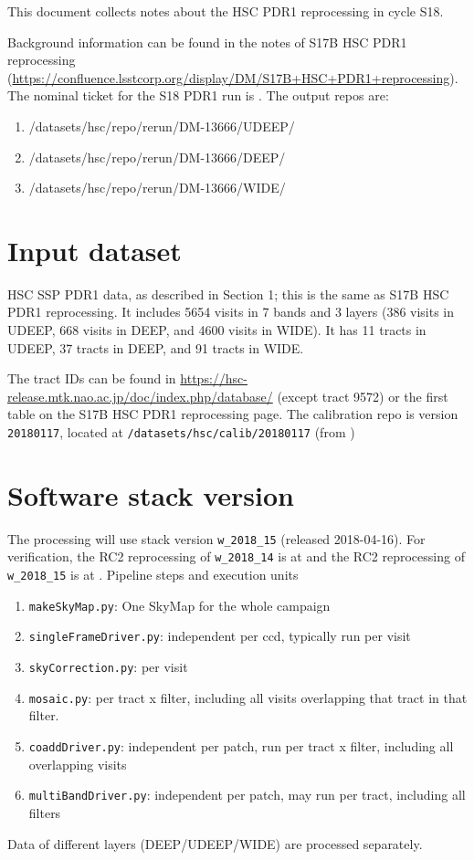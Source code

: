

This document collects notes about the HSC PDR1 reprocessing in cycle S18.

Background information can be found in the notes of S17B HSC PDR1 reprocessing (\url{https://confluence.lsstcorp.org/display/DM/S17B+HSC+PDR1+reprocessing}).
The nominal ticket for the S18 PDR1 run is .
The output repos are:
\begin{enumerate}
\item
/datasets/hsc/repo/rerun/DM-13666/UDEEP/
\item
/datasets/hsc/repo/rerun/DM-13666/DEEP/
\item
/datasets/hsc/repo/rerun/DM-13666/WIDE/
\end{enumerate}

\section{Input dataset}
HSC SSP PDR1 data, as described in  Section 1; this is the same as S17B HSC PDR1 reprocessing.
It includes 5654 visits in 7 bands and 3 layers (386 visits in UDEEP, 668 visits in DEEP, and 4600 visits in WIDE).
It has 11 tracts in UDEEP, 37 tracts in DEEP, and 91 tracts in WIDE.

The tract IDs can be found in \url{https://hsc-release.mtk.nao.ac.jp/doc/index.php/database/} (except tract 9572) or the first table on the S17B HSC PDR1 reprocessing page.
The calibration repo is version \texttt{20180117}, located at \texttt{/datasets/hsc/calib/20180117}  (from )

\section{Software stack version}
The processing will use stack version \texttt{w\_2018\_15} (released 2018-04-16).
For verification, the RC2 reprocessing of \texttt{w\_2018\_14} is at  and the RC2 reprocessing of \texttt{w\_2018\_15} is at .
Pipeline steps and execution units
\begin{enumerate}
\item \texttt{makeSkyMap.py}:   One SkyMap for the whole campaign
\item \texttt{singleFrameDriver.py}:   independent per ccd, typically run per visit
\item \texttt{skyCorrection.py}:   per visit
\item \texttt{mosaic.py}:   per tract x filter, including all visits overlapping that tract in that filter.
\item \texttt{coaddDriver.py}: independent per patch, run per tract x filter, including all overlapping visits
\item \texttt{multiBandDriver.py}:   independent per patch, may run per tract, including all filters
\end{enumerate}
Data of different layers (DEEP/UDEEP/WIDE) are processed separately.

